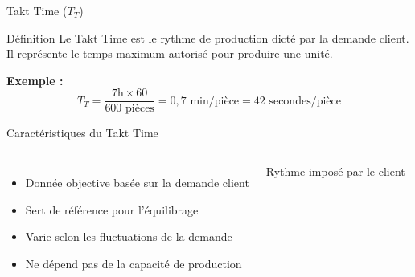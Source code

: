 \documentclass{beamer}
\begin{document}
\begin{frame}{Takt Time ($T_T$)}
    \begin{block}{Définition}
        Le Takt Time est le rythme de production dicté par la demande client. Il représente le temps maximum autorisé pour produire une unité.
    \end{block}
    
    \begin{center}
    \end{center}
    
    \vspace{0.3cm}
    \textbf{Exemple :}
    \[
    T_T = \frac{7\text{h} \times 60}{600 \text{ pièces}} = 0,7 \text{ min/pièce} = 42 \text{ secondes/pièce}
    \]
\end{frame}

\begin{frame}{Caractéristiques du Takt Time}
    \begin{columns}
        \begin{itemize}
            \item Donnée objective basée sur la demande client
            \item Sert de référence pour l'équilibrage
            \item Varie selon les fluctuations de la demande
            \item Ne dépend pas de la capacité de production
        \end{itemize}
        
        \begin{center}
            \small{Rythme imposé par le client}
        \end{center}
    \end{columns}
\end{frame}
\end{document}
